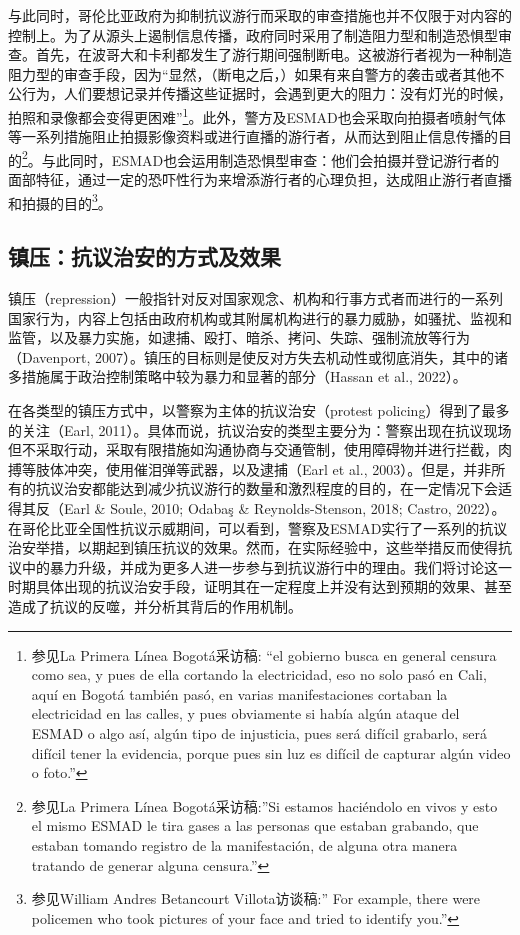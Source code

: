 \documentclass{phyasgn}\usepackage{nag}
\begin{document}
\par 与此同时，哥伦比亚政府为抑制抗议游行而采取的审查措施也并不仅限于对内容的控制上。为了从源头上遏制信息传播，政府同时采用了制造阻力型和制造恐惧型审查。首先，在波哥大和卡利都发生了游行期间强制断电。这被游行者视为一种制造阻力型的审查手段，因为“显然，（断电之后，）如果有来自警方的袭击或者其他不公行为，人们要想记录并传播这些证据时，会遇到更大的阻力：没有灯光的时候，拍照和录像都会变得更困难”\footnote[53]{参见La Primera Línea Bogotá采访稿: “el gobierno busca en general censura como sea, y pues de ella cortando la electricidad, eso no solo pasó en Cali, aquí en Bogotá también pasó, en varias manifestaciones cortaban la electricidad en las calles, y pues obviamente si había algún ataque del ESMAD o algo así, algún tipo de injusticia, pues será difícil grabarlo, será difícil tener la evidencia, porque pues sin luz es difícil de capturar algún video o foto.”}。此外，警方及ESMAD也会采取向拍摄者喷射气体等一系列措施阻止拍摄影像资料或进行直播的游行者，从而达到阻止信息传播的目的\footnote[54]{参见La Primera Línea Bogotá采访稿:”Si estamos haciéndolo en vivos y esto el mismo ESMAD le tira gases a las personas que estaban grabando, que estaban tomando registro de la manifestación, de alguna otra manera tratando de generar alguna censura.”}。与此同时，ESMAD也会运用制造恐惧型审查：他们会拍摄并登记游行者的面部特征，通过一定的恐吓性行为来增添游行者的心理负担，达成阻止游行者直播和拍摄的目的\footnote[55]{参见William Andres Betancourt Villota访谈稿:” For example, there were policemen who took pictures of your face and tried to identify you.”}。
\subsection{镇压：抗议治安的方式及效果}
镇压（repression）一般指针对反对国家观念、机构和行事方式者而进行的一系列国家行为，内容上包括由政府机构或其附属机构进行的暴力威胁，如骚扰、监视和监管，以及暴力实施，如逮捕、殴打、暗杀、拷问、失踪、强制流放等行为（Davenport, 2007）。镇压的目标则是使反对方失去机动性或彻底消失，其中的诸多措施属于政治控制策略中较为暴力和显著的部分（Hassan et al., 2022）。
\par 在各类型的镇压方式中，以警察为主体的抗议治安（protest policing）得到了最多的关注（Earl, 2011）。具体而说，抗议治安的类型主要分为：警察出现在抗议现场但不采取行动，采取有限措施如沟通协商与交通管制，使用障碍物并进行拦截，肉搏等肢体冲突，使用催泪弹等武器，以及逮捕（Earl et al., 2003）。但是，并非所有的抗议治安都能达到减少抗议游行的数量和激烈程度的目的，在一定情况下会适得其反（Earl \& Soule, 2010; Odabaş \& Reynolds-Stenson, 2018; Castro, 2022）。在哥伦比亚全国性抗议示威期间，可以看到，警察及ESMAD实行了一系列的抗议治安举措，以期起到镇压抗议的效果。然而，在实际经验中，这些举措反而使得抗议中的暴力升级，并成为更多人进一步参与到抗议游行中的理由。我们将讨论这一时期具体出现的抗议治安手段，证明其在一定程度上并没有达到预期的效果、甚至造成了抗议的反噬，并分析其背后的作用机制。
\end{document}
